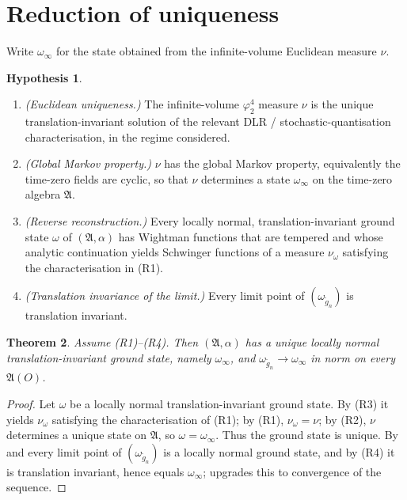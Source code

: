 \documentclass[11pt,a4paper]{article}
\theoremstyle{plain}
\newtheorem{theorem}{Theorem}[section]
\theoremstyle{definition}
\newtheorem{hypothesis}[theorem]{Hypothesis}
\newcommand{\A}{\mathfrak{A}}
\begin{document}
\section{Reduction of uniqueness}\label{sec:red}

Write $\omega_\infty$ for the state obtained from the infinite-volume Euclidean measure $\nu$.

\begin{hypothesis}\label{hyp:R}\hfill
\begin{enumerate}
\item[\rm(R1)] \emph{(Euclidean uniqueness.)} The infinite-volume $\varphi^4_2$ measure $\nu$ is the
      unique translation-invariant solution of the relevant DLR / stochastic-quantisation
      characterisation, in the regime considered.
\item[\rm(R2)] \emph{(Global Markov property.)} $\nu$ has the global Markov property, equivalently
      the time-zero fields are cyclic, so that $\nu$ determines a state $\omega_\infty$ on the
      time-zero algebra $\A$.
\item[\rm(R3)] \emph{(Reverse reconstruction.)} Every locally normal, translation-invariant ground
      state $\omega$ of $(\A,\alpha)$ has Wightman functions that are tempered and whose analytic
      continuation yields Schwinger functions of a measure $\nu_\omega$ satisfying the
      characterisation in (R1).
\item[\rm(R4)] \emph{(Translation invariance of the limit.)} Every limit point of
      $(\omega_{\tilde g_n})$ is translation invariant.
\end{enumerate}
\end{hypothesis}

\begin{theorem}\label{thm:red}
Assume (R1)--(R4). Then $(\A,\alpha)$ has a unique locally normal translation-invariant ground
state, namely $\omega_\infty$, and $\omega_{\tilde g_n}\to\omega_\infty$ in norm on every $\A(O)$.
\end{theorem}

\begin{proof}
Let $\omega$ be a locally normal translation-invariant ground state. By (R3) it yields
$\nu_\omega$ satisfying the characterisation of (R1); by (R1), $\nu_\omega=\nu$; by (R2), $\nu$
determines a unique state on $\A$, so $\omega=\omega_\infty$. Thus the ground state is unique. By
\cite[Cor.~4.3]{M0} and \cite[Cor.~4.1]{M1} every limit point of $(\omega_{\tilde g_n})$ is a
locally normal ground state, and by (R4) it is translation invariant, hence equals
$\omega_\infty$; \cite[Cor.~4.2]{M1} upgrades this to convergence of the sequence.
\end{proof}
\end{document}
